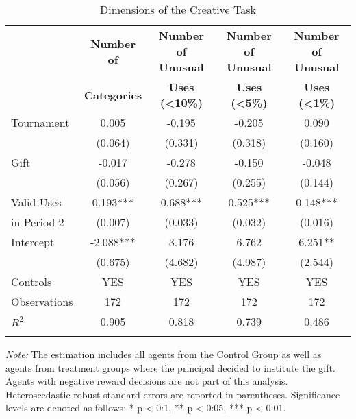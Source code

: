\begin{table}[h]%
\setlength\tabcolsep{2pt}
\caption{Dimensions of the Creative Task}
\begin{center}%
{\small\renewcommand{\arraystretch}{1}%
\begin{tabular}{lcccc}
\hline\hline\noalign{\smallskip}
 & \bf Number of  	& \bf Number of Unusual & \bf Number of Unusual & \bf Number of Unusual \\
 & \bf Categories  & \bf Uses (<10\%)		& \bf Uses (<5\%)		& \bf Uses (<1\%)	\\
\hline
Tournament 			& 0.005 & -0.195 & -0.205 & 0.090 \\
					& (0.064) & (0.331) & (0.318) & (0.160) \\
Gift               	& -0.017 & -0.278 & -0.150 & -0.048 \\
					& (0.056) & (0.267) & (0.255) & (0.144) \\
Valid Uses          & 0.193*** & 0.688*** & 0.525*** & 0.148*** \\
in Period 2			& (0.007) & (0.033) & (0.032) & (0.016) \\
Intercept           & -2.088*** & 3.176 & 6.762 & 6.251** \\
					& (0.675) & (4.682) & (4.987) & (2.544) \\
\hline
\noalign{\smallskip}
Controls & YES & YES & YES & YES  \\
\hline
\noalign{\smallskip}
Observations        &         172   &         172  &         172   &         172  \\ 
$R^2$               &       0.905   &       0.818  & 		0.739  & 		0.486    \\
\hline\hline\noalign{\medskip}
\end{tabular}}
\begin{minipage}{\textwidth}
\footnotesize {\it Note:} 
The estimation includes all agents from the Control Group as well as agents from treatment groups where the principal decided to institute the gift. Agents with negative reward decisions are not part of this analysis. 
Heteroscedastic-robust standard errors are reported in parentheses. Significance levels are denoted as follows: * p < 0:1, ** p < 0:05, *** p < 0:01. 
\end{minipage}
\end{center}
\end{table}
